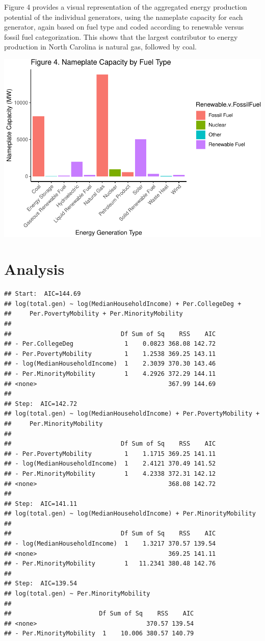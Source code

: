 \documentclass[
  12pt,
]{article}
\begin{document}
Figure 4 provides a visual representation of the aggregated energy
production potential of the individual generators, using the nameplate
capacity for each generator, again based on fuel type and coded
according to renewable versus fossil fuel categorization. This shows
that the largest contributor to energy production in North Carolina is
natural gas, followed by coal.

\includegraphics{Project_files/figure-latex/unnamed-chunk-4-1.pdf}

\newpage

\hypertarget{analysis}{%
\section{Analysis}\label{analysis}}

\begin{verbatim}
## Start:  AIC=144.69
## log(total.gen) ~ log(MedianHouseholdIncome) + Per.CollegeDeg + 
##     Per.PovertyMobility + Per.MinorityMobility
## 
##                              Df Sum of Sq    RSS    AIC
## - Per.CollegeDeg              1    0.0823 368.08 142.72
## - Per.PovertyMobility         1    1.2538 369.25 143.11
## - log(MedianHouseholdIncome)  1    2.3039 370.30 143.46
## - Per.MinorityMobility        1    4.2926 372.29 144.11
## <none>                                    367.99 144.69
## 
## Step:  AIC=142.72
## log(total.gen) ~ log(MedianHouseholdIncome) + Per.PovertyMobility + 
##     Per.MinorityMobility
## 
##                              Df Sum of Sq    RSS    AIC
## - Per.PovertyMobility         1    1.1715 369.25 141.11
## - log(MedianHouseholdIncome)  1    2.4121 370.49 141.52
## - Per.MinorityMobility        1    4.2338 372.31 142.12
## <none>                                    368.08 142.72
## 
## Step:  AIC=141.11
## log(total.gen) ~ log(MedianHouseholdIncome) + Per.MinorityMobility
## 
##                              Df Sum of Sq    RSS    AIC
## - log(MedianHouseholdIncome)  1    1.3217 370.57 139.54
## <none>                                    369.25 141.11
## - Per.MinorityMobility        1   11.2341 380.48 142.76
## 
## Step:  AIC=139.54
## log(total.gen) ~ Per.MinorityMobility
## 
##                        Df Sum of Sq    RSS    AIC
## <none>                              370.57 139.54
## - Per.MinorityMobility  1    10.006 380.57 140.79
\end{verbatim}
\end{document}
